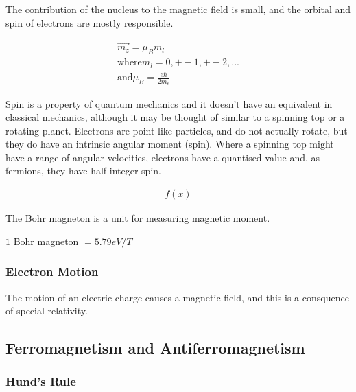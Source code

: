 The contribution of the nucleus to the magnetic field is small, and the orbital and spin of electrons are mostly responsible.

\begin{equation}
\begin{split}
\vec{m_z} = \mu_B m_l \\
\text{where} m_l = 0, +-1, +-2, ... \\
\text{and} \mu_B = \frac{e \hbar}{2 m_e}
\end{split}
\label{eq:eqSplineThreeEquations}
\end{equation}


Spin is a property of quantum mechanics and it doesn't have an equivalent in classical mechanics, although it may be thought of similar to a spinning top or a rotating planet.  Electrons are point like particles, and do not actually rotate, but they do have an intrinsic angular moment (spin).  Where a spinning top might have a range of angular velocities, electrons have a quantised value and, as fermions, they have half integer spin.  


\begin{equation}
\begin{split}
f(x)
\end{split}
\label{eq:pauliMatrices}
\end{equation}







The Bohr magneton is a unit for measuring magnetic moment.

$1$ Bohr magneton $ = 5.79 eV/T$


\subsubsection{Electron Motion}

The motion of an electric charge causes a magnetic field, and this is a consquence of special relativity.  

\eqAmpereLawIntegral



\subsection{Ferromagnetism and Antiferromagnetism}

\subsubsection{Hund's Rule}

